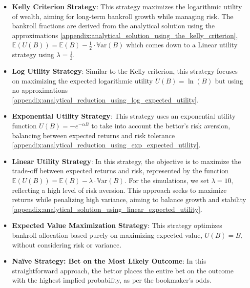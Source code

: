 \begin{itemize}
    \item \textbf{Kelly Criterion Strategy}: \cite{Kelly1956} \cite{Thorp1969}  
    This strategy maximizes the logarithmic utility of wealth, aiming for long-term bankroll growth while managing risk. The bankroll fractions are derived from the analytical solution using the approximations  \ref{appendix:analytical_solution_using_the_kelly_criterion}, \(\mathbb{E}(U(B)) = \mathbb{E}(B) - \frac{1}{2} \cdot \mathbb{V}\text{ar}(B) \) which comes down to a Linear utility strategy using \( \lambda = \frac{1}{2} \).

    \item \textbf{Log Utility Strategy}:  
    Similar to the Kelly criterion, this strategy focuses on maximizing the expected logarithmic utility \(U(B) = \ln(B)\)  but using no approximations \ref{appendix:analytical_reduction_using_log_expected_utility}.

    \item \textbf{Exponential Utility Strategy}:  
    This strategy uses an exponential utility function \(U(B) = -e^{-\alpha B}\) to take into account the bettor’s risk aversion, balancing between expected returns and risk tolerance \ref{appendix:analytical_reduction_using_exp_expected_utility}.

    \item \textbf{Linear Utility Strategy}:
    In this strategy, the objective is to maximize the trade-off between expected returns and risk, represented by the function \(\mathbb{E}(U(B)) = \mathbb{E}(B) - \lambda \cdot \mathbb{V}\text{ar}(B) \). For the simulations, we set \( \lambda = 10 \), reflecting a high level of risk aversion. This approach seeks to maximize returns while penalizing high variance, aiming to balance growth and stability \ref{appendix:analytical_solution_using_linear_expected_utility}. 

    \item \textbf{Expected Value Maximization Strategy}:  
    This strategy optimizes bankroll allocation based purely on maximizing expected value, \(U(B) = B\), without considering risk or variance.

    \item \textbf{Naïve Strategy: Bet on the Most Likely Outcome}:  
    In this straightforward approach, the bettor places the entire bet on the outcome with the highest implied probability, as per the bookmaker's odds.
    

\end{itemize}
